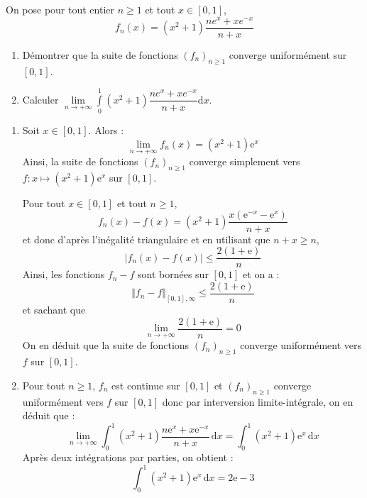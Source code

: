\documentclass[a4paper,10pt]{report}
\begin{document}
\medskip


\begin{Exercice}{} On pose pour tout entier $n \geq 1$ et tout $x \in [0,1]$,
$$f_{n}\left( x\right) =\left( x^{2}+1\right) \dfrac{ne^{x}+xe^{-x}}{n+x} $$

\begin{enumerate}
\item Démontrer que la suite de fonctions $\left( f_{n}\right) _{n \geq 1}$ converge uniform\'{e}ment sur $[0,1]$.
\item Calculer $\underset{n\rightarrow +\infty }{\lim }\displaystyle\int\limits_{0}^{1}\left( x^{2}+1\right) \dfrac{ne^{x}+xe^{-x}}{n+x}\text{d}x$.
\end{enumerate}
\end{Exercice} 

\corr \begin{enumerate}
\item Soit $x \in \left[ {0,1} \right]$. Alors :
$$\lim\limits_{n\to +\infty}^{}f_n (x)=(x^2  + 1){\mathrm{e}}^x $$
Ainsi, la suite de fonctions $(f_n)_{n \geq 1}$ converge simplement vers $f:x \mapsto (x^2  + 1){\mathrm{e}}^x $ sur $\left[ {0,1} \right]$.
\medskip

\noindent Pour tout $x\in \left[ 0,1\right]$ et tout $n \geq 1$, 
$$f_n (x) - f(x) = (x^2  + 1)\dfrac{{x({\mathrm{e}}^{ - x}  - {\mathrm{e}}^x )}}{{n + x}}$$
et donc d'après l'inégalité triangulaire et en utilisant que $n+x \geq n$,
$$\left| {f_n (x) - f(x)} \right| \leq \dfrac{{2(1+\textrm{e})}}{n}$$
Ainsi, les fonctions $f_n-f$ sont bornées sur $[0,1]$ et on a :
$$ \Vert f_n -f \Vert_{[0,1], \infty} \leq \dfrac{{2(1+\textrm{e})}}{n}$$
et sachant que 
$$ \lim_{n \rightarrow + \infty} \dfrac{{2(1+\textrm{e})}}{n} = 0 $$
On en déduit que la suite de fonctions $(f_n)_{n \geq 1}$ converge uniformément vers $f$ sur $\left[ {0,1} \right]$.
\item Pour tout $n \geq 1$, $f_n$ est continue sur $[0,1]$ et $(f_n)_{n \geq 1}$ converge uniformément vers $f$ sur $\left[ {0,1} \right]$ donc par interversion limite-intégrale, on en déduit que :
$$\mathop {\lim }\limits_{n \to  + \infty } \displaystyle\int_0^1 {(x^2  + 1)\dfrac{{n{\mathrm{e}}^x  + x{\mathrm{e}}^{ - x} }}{{n + x}}\,{\mathrm{d}}x}  = \displaystyle\int_0^1 {(x^2  + 1){\mathrm{e}}^x \,{\mathrm{d}}x} $$
Après deux intégrations par parties, on obtient :
$$\displaystyle\int_0^1 {(x^2  + 1){\mathrm{e}}^x \,{\mathrm{d}}x}  = 2{\mathrm{e}} - 3$$
\end{enumerate}


\medskip
\end{document}
